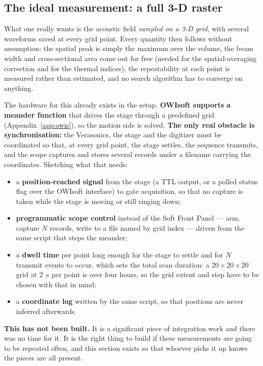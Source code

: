 \documentclass[11pt,a4paper]{article}
\newcommand{\good}[1]{\textcolor{green!45!black}{\textbf{#1}}}
\newcommand{\caveat}[1]{\textcolor{orange!75!black}{\textbf{#1}}}
\begin{document}
\subsection{The ideal measurement: a full 3-D raster}\label{sec:ideal}
What one really wants is the acoustic field \emph{sampled on a 3-D grid}, with several waveforms
saved at every grid point. Every quantity then follows without assumption: the spatial peak is simply
the maximum over the volume, the beam width and cross-sectional area come out for free (needed for
the spatial-averaging correction and for the thermal indices), the repeatability at each point is
measured rather than estimated, and no search algorithm has to converge on anything.

The hardware for this already exists in the setup. \textbf{OWIsoft supports a meander function} that
drives the stage through a predefined grid (Appendix~\ref{app:owis}), so the motion side is solved. \good{The only real
obstacle is synchronisation:} the Verasonics, the stage and the digitizer must be coordinated so
that, at every grid point, the stage settles, the sequence transmits, and the scope captures and
stores several records under a filename carrying the coordinates. Sketching what that needs:

\begin{itemize}
  \item a \textbf{position-reached signal} from the stage (a TTL output, or a polled status flag over
    the OWIsoft interface) to gate acquisition, so that no capture is taken while the stage is
    moving or still ringing down;
  \item \textbf{programmatic scope control} instead of the Soft Front Panel --- arm, capture $N$
    records, write to a file named by grid index --- driven from the same script that steps the
    meander;
  \item a \textbf{dwell time} per point long enough for the stage to settle and for $N$ transmit
    events to occur, which sets the total scan duration: a $20\times20\times20$ grid at
    \SI{2}{\second} per point is over four hours, so the grid extent and step have to be chosen with
    that in mind;
  \item a \textbf{coordinate log} written by the same script, so that positions are never inferred
    afterwards.
\end{itemize}

\caveat{This has not been built.} It is a significant piece of integration work and there was no time
for it. It is the right thing to build if these measurements are going to be repeated often, and
this section exists so that whoever picks it up knows the pieces are all present.
\end{document}
